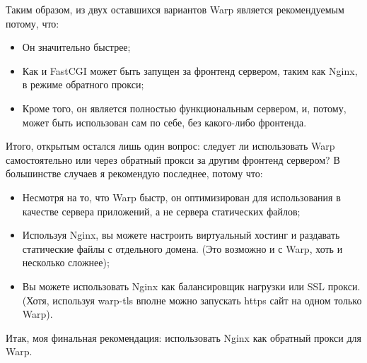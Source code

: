 %
Таким образом, из двух оставшихся вариантов Warp является рекомендуемым потому, что:
\begin{itemize}
  \item Он значительно быстрее;
  \item Как и FastCGI может быть запущен за фронтенд сервером, таким как Nginx, в режиме обратного прокси;
  \item Кроме того, он является полностью функциональным сервером, и, потому, может быть использован сам по себе, без какого-либо фронтенда.
\end{itemize}
%
%
%

Итого, открытым остался лишь один вопрос: следует ли использовать Warp самостоятельно или через обратный прокси за другим фронтенд сервером? В большинстве случаев я рекомендую последнее, потому что:
\begin{itemize}
  \item Несмотря на то, что Warp быстр, он оптимизирован для использования в качестве сервера приложений, а не сервера статических файлов;
  \item Используя Nginx, вы можете настроить виртуальный хостинг и раздавать статические файлы с отдельного домена. (Это возможно и с Warp, хоть и несколько сложнее);
  \item Вы можете использовать Nginx как балансировщик нагрузки или SSL прокси. (Хотя, используя warp-tls вполне можно запускать https сайт на одном только Warp).
\end{itemize}

Итак, моя финальная рекомендация: использовать Nginx как обратный прокси для Warp.

